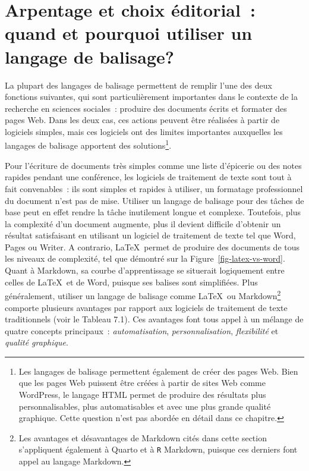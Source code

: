 \documentclass[
  letterpaper,
  DIV=11,
  numbers=noendperiod]{scrreprt}
\begin{document}
\section{Arpentage et choix éditorial~: quand et pourquoi utiliser un
langage de
balisage?}\label{arpentage-et-choix-uxe9ditorial-quand-et-pourquoi-utiliser-un-langage-de-balisage}

La plupart des langages de balisage permettent de remplir l'une des deux
fonctions suivantes, qui sont particulièrement importantes dans le
contexte de la recherche en sciences sociales~: produire des documents
écrits et formater des pages Web. Dans les deux cas, ces actions peuvent
être réalisées à partir de logiciels simples, mais ces logiciels ont des
limites importantes auxquelles les langages de balisage apportent des
solutions\footnote{Les langages de balisage permettent également de
  créer des pages Web. Bien que les pages Web puissent être créées à
  partir de sites Web comme WordPress, le langage HTML permet de
  produire des résultats plus personnalisables, plus automatisables et
  avec une plus grande qualité graphique. Cette question n'est pas
  abordée en détail dans ce chapitre.}.

Pour l'écriture de documents très simples comme une liste d'épicerie ou
des notes rapides pendant une conférence, les logiciels de traitement de
texte sont tout à fait convenables~: ils sont simples et rapides à
utiliser, un formatage professionnel du document n'est pas de mise.
Utiliser un langage de balisage pour des tâches de base peut en effet
rendre la tâche inutilement longue et complexe. Toutefois, plus la
complexité d'un document augmente, plus il devient difficile d'obtenir
un résultat satisfaisant en utilisant un logiciel de traitement de texte
tel que Word, Pages ou Writer. A contrario, \LaTeX~permet de produire
des documents de tous les niveaux de complexité, tel que démontré sur la
Figure~\ref{fig-latex-vs-word}. Quant à Markdown, sa courbe
d'apprentissage se situerait logiquement entre celles de \LaTeX~et de
Word, puisque ses balises sont simplifiées. Plus généralement, utiliser
un langage de balisage comme \LaTeX~ou Markdown\footnote{Les avantages
  et désavantages de Markdown cités dans cette section s'appliquent
  également à Quarto et à \texttt{R} Markdown, puisque ces derniers font
  appel au langage Markdown.} comporte plusieurs avantages par rapport
aux logiciels de traitement de texte traditionnels (voir le Tableau
7.1). Ces avantages font tous appel à un mélange de quatre concepts
principaux~: \emph{automatisation}, \emph{personnalisation},
\emph{flexibilité} et \emph{qualité graphique}.
\end{document}
